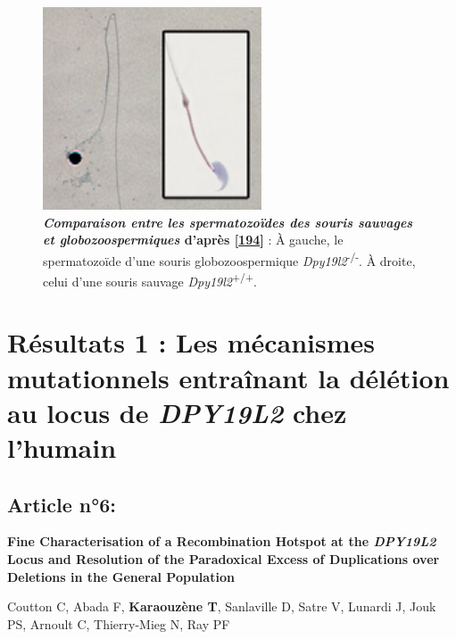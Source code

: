 \documentclass[12pt,a4paper,twoside]{ugathesis}
\theoremstyle{definition}
\theoremstyle{definition}
\theoremstyle{definition}
\theoremstyle{remark}
\begin{document}
\begin{figure}

{\centering \includegraphics[scale=.9]{figure/mouse_globo_spz} 

}

\caption[Comparaison entre les spermatozoïdes des
souris sauvages et globozoospermiques]{\textbf{\emph{Comparaison entre les spermatozoïdes
des souris sauvages et globozoospermiques} d'après
{[}\protect\hyperlink{ref-Pierre2012}{194}{]}} : À gauche, le
spermatozoïde d'une souris globozoospermique
\emph{Dpy19l2}\textsuperscript{-/-}. À droite, celui d'une souris
sauvage \emph{Dpy19l2}\textsuperscript{+/+}.\\}\label{fig:pictmouseglobo}
\end{figure}










\newpage

\section{\texorpdfstring{Résultats 1 : Les mécanismes mutationnels
entraînant la délétion au locus de \emph{DPY19L2} chez
l'humain}{Résultats 1 : Les mécanismes mutationnels entraînant la délétion au locus de DPY19L2 chez l'humain}}\label{mecamut}

\subsection{Article n°6:}\label{article-n6}

\textbf{Fine Characterisation of a Recombination Hotspot at the
\emph{DPY19L2} Locus and Resolution of the Paradoxical Excess of
Duplications over Deletions in the General Population}

Coutton C, Abada F, \textbf{Karaouzène T}, Sanlaville D, Satre V,
Lunardi J, Jouk PS, Arnoult C, Thierry-Mieg N, Ray PF
\end{document}
